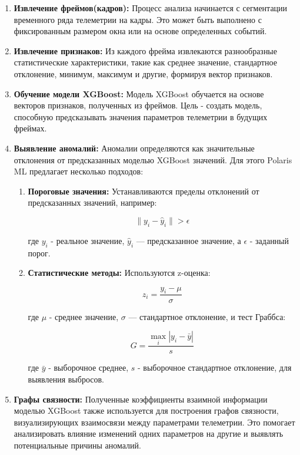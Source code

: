 \begin{enumerate}[label=\arabic*.]
	\item \textbf{Извлечение фреймов(кадров):} Процесс анализа начинается с сегментации
	      временного ряда телеметрии на кадры.
	      Это может быть выполнено с фиксированным размером окна или на основе
	      определенных событий.
	\item \textbf{Извлечение признаков:} Из каждого фрейма извлекаются
	      разнообразные статистические характеристики, такие как среднее значение,
	      стандартное отклонение, минимум, максимум и другие, формируя вектор
	      признаков.
	\item \textbf{Обучение модели XGBoost:} Модель XGBoost обучается на основе
	      векторов признаков, полученных из фреймов.
	      Цель - создать модель, способную предсказывать значения параметров
	      телеметрии в будущих фреймах.
	\item \textbf{Выявление аномалий:} Аномалии определяются как значительные
	      отклонения от предсказанных моделью XGBoost значений.
	      Для этого Polaris ML предлагает несколько подходов:
	      \begin{enumerate}[label=\alph*.]
		      \item \textbf{Пороговые значения:} Устанавливаются пределы отклонений от предсказанных значений, например:

		            \[\| y_i - \hat{y}_i \| > \epsilon\]

		            где $y_i$ - реальное значение, $\hat{y}_i$ — предсказанное значение, а $\epsilon$ - заданный порог.
		      \item \textbf{Статистические методы:} Используются z-оценка:

		            \[z_i = \frac{y_i - \mu}{\sigma}\]

		            где $\mu$ - среднее значение, $\sigma$ — стандартное отклонение, и тест Граббса:

		            \[G = \frac{\max_{i}|y_i - \bar{y}|}{s}\]

		            где $\bar{y}$ - выборочное среднее, $s$ - выборочное стандартное отклонение, для выявления выбросов.
	      \end{enumerate}
	\item \textbf{Графы связности:} Полученные коэффициенты взаимной информации моделью XGBoost также используется для
	      построения графов связности, визуализирующих взаимосвязи между параметрами
	      телеметрии.
	      Это помогает анализировать влияние изменений одних параметров на другие
	      и выявлять потенциальные причины аномалий.
\end{enumerate}


